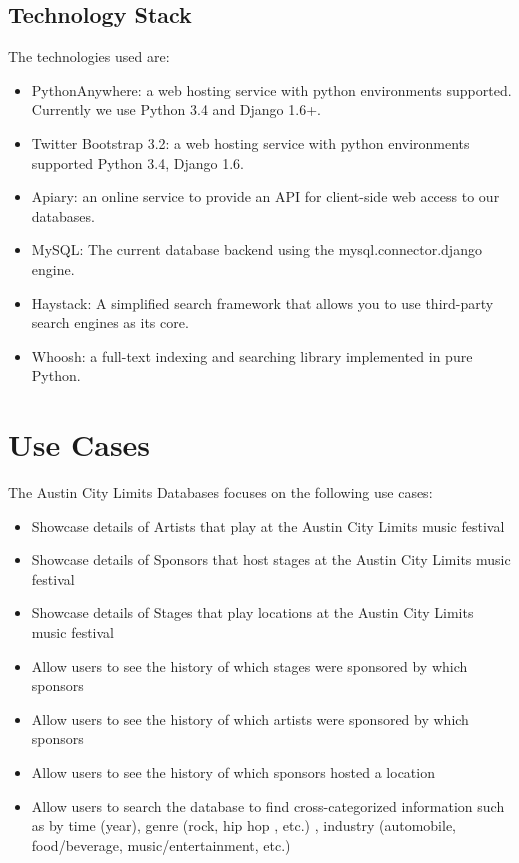 \documentclass[12pt,english]{scrartcl}
\begin{document}
\subsection{Technology Stack}
The technologies used are:
\begin{itemize}
 \item PythonAnywhere: a web hosting service with python environments supported. Currently we use Python 3.4 and Django 1.6+.
\end{itemize}
\begin{itemize}
 \item Twitter Bootstrap 3.2: a web hosting service with python environments supported Python 3.4, Django 1.6.
\end{itemize}
\begin{itemize}
 \item Apiary: an online service to provide an API for client-side web access to our databases.
\end{itemize}
\begin{itemize}
 \item MySQL: The current database backend using the mysql.connector.django engine.
\end{itemize}
\begin{itemize}
 \item Haystack: A simplified search framework that allows you to use third-party search engines as its core.
 \end{itemize}
\begin{itemize}
 \item Whoosh: a full-text indexing and searching library implemented in pure Python.
\end{itemize}

\section{Use Cases}
The Austin City Limits Databases focuses on the following use cases:
\begin{itemize}
 \item Showcase details of Artists that play at the Austin City Limits music festival
 \item Showcase details of Sponsors that host stages at the Austin City Limits music festival
 \item Showcase details of Stages that play locations at the Austin City Limits music festival
 \item Allow users to see the history of which stages were sponsored by which sponsors
 \item Allow users to see the history of which artists were sponsored by which sponsors
 \item Allow users to see the history of which sponsors hosted a location
 \item Allow users to search the database to find cross-categorized information such as by time (year), genre (rock, hip hop , etc.)
 , industry (automobile, food/beverage, music/entertainment, etc.)
\end{itemize}
\end{document}
